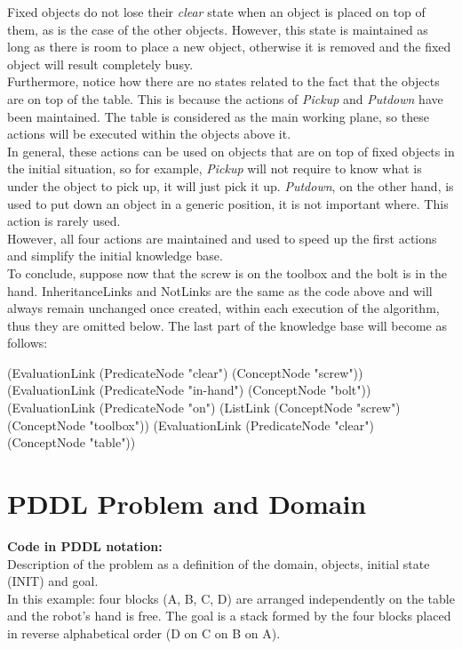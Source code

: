 Fixed objects do not lose their \textit{clear} state when an object is placed on top of them, as is the case of the other objects. However, this state is maintained as long as there is room to place a new object, otherwise it is removed and the fixed object will result completely busy. \\
Furthermore, notice how there are no states related to the fact that the objects are on top of the table. This is because the actions of \textit{Pickup} and \textit{Putdown} have been maintained. The table is considered as the main working plane, so these actions will be executed within the objects above it. \\
In general, these actions can be used on objects that are on top of fixed objects in the initial situation, so for example, \textit{Pickup} will not require to know what is under the object to pick up, it will just pick it up. \textit{Putdown}, on the other hand, is used to put down an object in a generic position, it is not important where. This action is rarely used. \\
However, all four actions are maintained and used to speed up the first actions and simplify the initial knowledge base.\\

To conclude, suppose now that the screw is on the toolbox and the bolt is in the hand. InheritanceLinks and NotLinks are the same as the code above and will always remain unchanged once created, within each execution of the algorithm, thus they are omitted below. The last part of the knowledge base will become as follows: \\

\begin{python}	
	(EvaluationLink
		(PredicateNode "clear")
		(ConceptNode "screw"))
	(EvaluationLink
		(PredicateNode "in-hand")
		(ConceptNode "bolt"))
	(EvaluationLink
		(PredicateNode "on")
		(ListLink
			(ConceptNode "screw")
			(ConceptNode "toolbox"))
	(EvaluationLink
		(PredicateNode "clear")
		(ConceptNode "table"))
\end{python}


\section{PDDL Problem and Domain}\label{sec:PDDL} 

\begin{footnotesize}
\textbf{Code in PDDL notation:} \\
Description of the problem as a definition of the domain, objects, initial state (INIT) and goal. \\
In this example: four blocks (A, B, C, D) are arranged independently on the table and the robot's hand is free. The goal is a stack formed by the four blocks placed in reverse alphabetical order (D on C on B on A).
\end{footnotesize}

